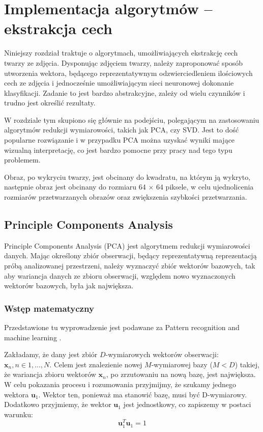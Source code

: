 \documentclass[oneside, eng]{mgr}
\newcommand{\bb}{\textbf}
\begin{document}
\newpage
 
\chapter{Implementacja algorytmów – ekstrakcja cech}

Niniejszy rozdział traktuje o algorytmach, umożliwiających ekstrakcję cech twarzy ze zdjęcia. Dysponując zdjęciem twarzy, należy zaproponować sposób utworzenia wektora, będącego reprezentatywnym odzwierciedleniem ilościowych cech ze zdjęcia i jednocześnie umożliwiającym sieci neuronowej dokonanie klasyfikacji. Zadanie to jest bardzo abstrakcyjne, zależy od wielu czynników i trudno jest określić rezultaty.

W rozdziale tym skupiono się głównie na podejściu, polegającym na zastosowaniu algorytmów redukcji wymiarowości, takich jak PCA, czy SVD. Jest to dość popularne rozwiązanie i w przypadku PCA można uzyskać wyniki mające wizualną interpretację, co jest bardzo pomocne przy pracy nad tego typu problemem.

Obraz, po wykryciu twarzy, jest obcinany do kwadratu, na którym ją wykryto, następnie obraz jest obcinany do rozmiaru 64 $\times$ 64 piksele, w celu ujednolicenia rozmiarów przetwarzanych obrazów oraz zwiększenia szybkości przetwarzania.
 
\section{Principle Components Analysis}

Principle Components Analysis (PCA) jest algorytmem redukcji wymiarowości danych. Mając określony zbiór obserwacji, będący reprezentatywną reprezentacją próbą analizowanej przestrzeni, należy wyznaczyć zbiór wektorów bazowych, tak aby wariancja danych ze zbioru obserwacji, względem nowo wyznaczonych wektorów bazowych, była jak największa.

\subsection{Wstęp matematyczny}

Przedstawione tu wyprowadzenie jest podawane za Pattern recognition and machine learning \cite{Pattern recognition}.

Zakładamy, że dany jest zbiór $D$-wymiarowych wektorów obserwacji: $\bb{x}_n , n \in 1,...,N $. Celem jest znalezienie nowej $M$-wymiarowej bazy ($M < D$) takiej, że wariancja zbioru wektorów $\bb{x}_n$, po zrzutowaniu na nową bazę, jest największa. W celu pokazania procesu i rozumowania przyjmijmy, że szukamy jednego wektora $\bb{u}_1$. Wektor ten, ponieważ ma stanowić bazę, musi być D-wymiarowy. Dodatkowo przyjmiemy, że wektor $\bb{u}_1$ jest jednostkowy, co zapiszemy w postaci warunku:
\begin{equation} \label{eq:wektor_jednostkowy}
	\bb{u}_1^{T}\bb{u}_1 = 1
\end{equation}
\end{document}
